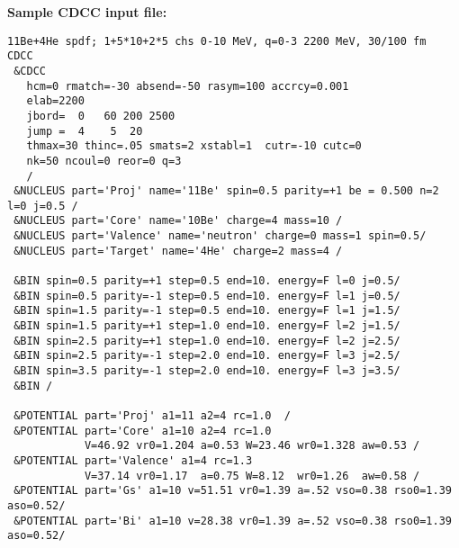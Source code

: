 \documentclass[11pt]{article}
\begin{document}
\newpage
\vspace{8mm}
{\bf Sample CDCC input file:}
\begin{verbatim}
11Be+4He spdf; 1+5*10+2*5 chs 0-10 MeV, q=0-3 2200 MeV, 30/100 fm
CDCC
 &CDCC
   hcm=0 rmatch=-30 absend=-50 rasym=100 accrcy=0.001
   elab=2200
   jbord=  0   60 200 2500
   jump =  4    5  20
   thmax=30 thinc=.05 smats=2 xstabl=1  cutr=-10 cutc=0
   nk=50 ncoul=0 reor=0 q=3
   /
 &NUCLEUS part='Proj' name='11Be' spin=0.5 parity=+1 be = 0.500 n=2 l=0 j=0.5 /
 &NUCLEUS part='Core' name='10Be' charge=4 mass=10 /
 &NUCLEUS part='Valence' name='neutron' charge=0 mass=1 spin=0.5/
 &NUCLEUS part='Target' name='4He' charge=2 mass=4 /

 &BIN spin=0.5 parity=+1 step=0.5 end=10. energy=F l=0 j=0.5/
 &BIN spin=0.5 parity=-1 step=0.5 end=10. energy=F l=1 j=0.5/
 &BIN spin=1.5 parity=-1 step=0.5 end=10. energy=F l=1 j=1.5/
 &BIN spin=1.5 parity=+1 step=1.0 end=10. energy=F l=2 j=1.5/
 &BIN spin=2.5 parity=+1 step=1.0 end=10. energy=F l=2 j=2.5/
 &BIN spin=2.5 parity=-1 step=2.0 end=10. energy=F l=3 j=2.5/
 &BIN spin=3.5 parity=-1 step=2.0 end=10. energy=F l=3 j=3.5/
 &BIN /

 &POTENTIAL part='Proj' a1=11 a2=4 rc=1.0  /
 &POTENTIAL part='Core' a1=10 a2=4 rc=1.0
            V=46.92 vr0=1.204 a=0.53 W=23.46 wr0=1.328 aw=0.53 /
 &POTENTIAL part='Valence' a1=4 rc=1.3
            V=37.14 vr0=1.17  a=0.75 W=8.12  wr0=1.26  aw=0.58 /
 &POTENTIAL part='Gs' a1=10 v=51.51 vr0=1.39 a=.52 vso=0.38 rso0=1.39 aso=0.52/
 &POTENTIAL part='Bi' a1=10 v=28.38 vr0=1.39 a=.52 vso=0.38 rso0=1.39 aso=0.52/
\end{verbatim}

\newpage

%
%
\end{document}
